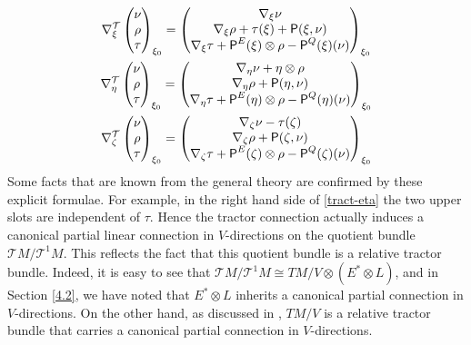 \documentclass[11pt]{amsart}
\def\Rho{\mbox{\textsf{P}}}
\numberwithin{proposition}{section}
\numberwithin{equation}{section}
\begin{document}
\begin{gather}
    \label{tract-xi}
    \nabla^{\mathcal T}_\xi\begin{pmatrix}\nu \\ \rho\\ \tau\end{pmatrix}_{\xi_0}=\begin{pmatrix}\nabla_\xi\nu \\ \nabla_\xi\rho+\tau(\xi)+\Rho(\xi,\nu)\\ \nabla_\xi \tau+\Rho^E(\xi)\otimes\rho-\Rho^Q(\xi)(\nu)\end{pmatrix}_{\xi_0}\\ 
    \label{tract-eta}
    \nabla^{\mathcal T}_\eta\begin{pmatrix}\nu \\ \rho\\ \tau\end{pmatrix}_{\xi_0}=\begin{pmatrix}\nabla_\eta\nu+\eta\otimes\rho \\ \nabla_\eta\rho+\Rho(\eta,\nu)\\ \nabla_\eta \tau+\Rho^E(\eta)\otimes\rho-\Rho^Q(\eta)(\nu)\end{pmatrix}_{\xi_0}\\
    \label{tract-zeta}
    \nabla^{\mathcal T}_\zeta\begin{pmatrix}\nu \\ \rho\\ \tau\end{pmatrix}_{\xi_0}=\begin{pmatrix}\nabla_\zeta\nu-\tau(\zeta) \\ \nabla_\zeta\rho+\Rho(\zeta,\nu)\\ \nabla_\zeta \tau+\Rho^E(\zeta)\otimes\rho-\Rho^Q(\zeta)(\nu)\end{pmatrix}_{\xi_0}
\end{gather}
Some facts that are known from the general theory are confirmed by these explicit formulae. For example, in the right hand side of \eqref{tract-eta} the two upper slots are independent of $\tau$. Hence the tractor connection actually induces a canonical partial linear connection in $V$-directions on the quotient bundle $\mathcal TM/\mathcal T^1M$. This reflects the fact that this quotient bundle is a relative tractor bundle. Indeed, it is easy to see that $\mathcal TM/\mathcal T^1M\cong TM/V\otimes (E^*\otimes L)$, and in Section \ref{4.2}, we have noted that $E^*\otimes L$ inherits a canonical partial connection in $V$-directions. On the other hand, as discussed in \cite{Relative}, $TM/V$ is a relative tractor bundle that carries a canonical partial connection in $V$-directions.
\end{document}
